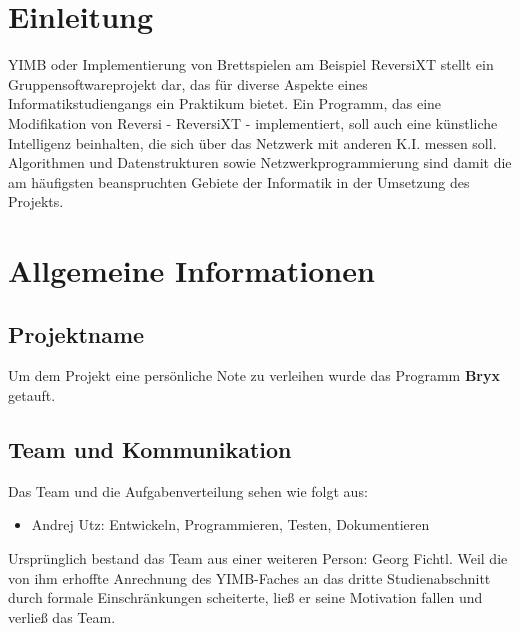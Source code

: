 \documentclass[12pt,a4paper]{article}
\begin{document}
\section{Einleitung}
YIMB oder \glqq Implementierung von Brettspielen am Beispiel ReversiXT\grqq{} stellt ein Gruppensoftwareprojekt dar, das für diverse Aspekte eines 
Informatikstudiengangs ein Praktikum bietet. Ein Programm, das eine Modifikation von Reversi - ReversiXT - implementiert, soll auch eine künstliche 
Intelligenz beinhalten, die sich über das Netzwerk mit anderen K.I. messen soll. Algorithmen und Datenstrukturen sowie Netzwerkprogrammierung sind 
damit die am häufigsten beanspruchten Gebiete der Informatik in der Umsetzung des Projekts.


\newpage
\section{Allgemeine Informationen}

\subsection{Projektname}
Um dem Projekt eine persönliche Note zu verleihen wurde das Programm \glqq \textbf{Bryx}\grqq{} getauft.


\subsection{Team und Kommunikation}
Das Team und die Aufgabenverteilung sehen wie folgt aus:
\begin{itemize}
	\item Andrej Utz: Entwickeln, Programmieren, Testen, Dokumentieren
\end{itemize}

Ursprünglich bestand das Team aus einer weiteren Person: Georg Fichtl. Weil die von ihm erhoffte Anrechnung des YIMB-Faches an das dritte Studienabschnitt durch formale Einschränkungen scheiterte, ließ er seine Motivation fallen und verließ das Team.
\end{document}
